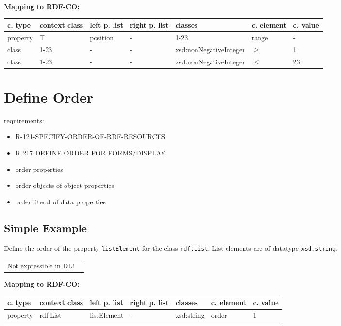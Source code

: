 \documentclass{llncs}
\newcommand{\ms}[1]{\texttt{#1}}
\newenvironment{gcotable}{
  \scriptsize
  \sffamily
  \vspace{0cm}
	\begin{center}
	\textbf{\vspace{0.4cm}Mapping to RDF-CO:} \\
  \begin{tabular}{l|l|l|l|l|l|l}
	\hline
  \textbf{c. type} & \textbf{context class} & \textbf{left p. list} & \textbf{right p. list} & \textbf{classes} & \textbf{c. element} & \textbf{c. value} \\
  \hline

}{
  \hline
  \end{tabular}
	\end{center}
}
\newenvironment{DL}{
  \vspace{0cm}
	\begin{center}
  \begin{tabular}{r l}

}{
  \end{tabular}
	\end{center}
}
\begin{document}
\begin{gcotable}
property & $\top$ & position & - & 1-23 & range & - \\
class & 1-23 & - & - & xsd:nonNegativeInteger & $\geq$ & 1 \\
class & 1-23 & - & - & xsd:nonNegativeInteger & $\leq$ & 23 \\
\end{gcotable}

%

\section{Define Order}

requirements:

\begin{itemize}
  \item R-121-SPECIFY-ORDER-OF-RDF-RESOURCES
	\item R-217-DEFINE-ORDER-FOR-FORMS/DISPLAY
\end{itemize}



\begin{itemize}
	\item order properties
	\item order objects of object properties
	\item order literal of data properties
\end{itemize}

\subsection{Simple Example}

Define the order of the property \ms{listElement} for the class \ms{rdf:List}.
List elements are of datatype \ms{xsd:string}.

\begin{DL}
Not expressible in DL!
\end{DL}

\begin{gcotable}
property & rdf:List & listElement & - & xsd:string & order & 1 \\
\end{gcotable}
\end{document}
